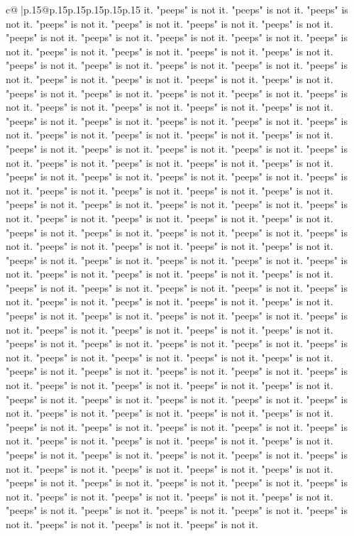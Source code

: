 \documentclass{article}
\begin{document}
{\begin{supertabular}{c@{$\;$}|p{.15\linewidth}@{}p{.15\linewidth}p{.15\linewidth}p{.15\linewidth}p{.15\linewidth}p{.15\linewidth}}
{{{it. "peeps" is not it. "peeps" is not it. "peeps" is not it. "peeps" is not it. "peeps" is not it. "peeps" is not it. "peeps" is not it. "peeps" is not it. "peeps" is not it. "peeps" is not it. "peeps" is not it. "peeps" is not it. "peeps" is not it. "peeps" is not it. "peeps" is not it. "peeps" is not it. "peeps" is not it. "peeps" is not it. "peeps" is not it. "peeps" is not it. "peeps" is not it. "peeps" is not it. "peeps" is not it. "peeps" is not it. "peeps" is not it. "peeps" is not it. "peeps" is not it. "peeps" is not it. "peeps" is not it. "peeps" is not it. "peeps" is not it. "peeps" is not it. "peeps" is not it. "peeps" is not it. "peeps" is not it. "peeps" is not it. "peeps" is not it. "peeps" is not it. "peeps" is not it. "peeps" is not it. "peeps" is not it. "peeps" is not it. "peeps" is not it. "peeps" is not it. "peeps" is not it. "peeps" is not it. "peeps" is not it. "peeps" is not it. "peeps" is not it. "peeps" is not it. "peeps" is not it. "peeps" is not it. "peeps" is not it. "peeps" is not it. "peeps" is not it. "peeps" is not it. "peeps" is not it. "peeps" is not it. "peeps" is not it. "peeps" is not it. "peeps" is not it. "peeps" is not it. "peeps" is not it. "peeps" is not it. "peeps" is not it. "peeps" is not it. "peeps" is not it. "peeps" is not it. "peeps" is not it. "peeps" is not it. "peeps" is not it. "peeps" is not it. "peeps" is not it. "peeps" is not it. "peeps" is not it. "peeps" is not it. "peeps" is not it. "peeps" is not it. "peeps" is not it. "peeps" is not it. "peeps" is not it. "peeps" is not it. "peeps" is not it. "peeps" is not it. "peeps" is not it. "peeps" is not it. "peeps" is not it. "peeps" is not it. "peeps" is not it. "peeps" is not it. "peeps" is not it. "peeps" is not it. "peeps" is not it. "peeps" is not it. "peeps" is not it. "peeps" is not it. "peeps" is not it. "peeps" is not it. "peeps" is not it. "peeps" is not it. "peeps" is not it. "peeps" is not it. "peeps" is not it. "peeps" is not it. "peeps" is not it. "peeps" is not it. "peeps" is not it. "peeps" is not it. "peeps" is not it. "peeps" is not it. "peeps" is not it. "peeps" is not it. "peeps" is not it. "peeps" is not it. "peeps" is not it. "peeps" is not it. "peeps" is not it. "peeps" is not it. "peeps" is not it. "peeps" is not it. "peeps" is not it. "peeps" is not it. "peeps" is not it. "peeps" is not it. "peeps" is not it. "peeps" is not it. "peeps" is not it. "peeps" is not it. "peeps" is not it. "peeps" is not it. "peeps" is not it. "peeps" is not it. "peeps" is not it. "peeps" is not it. "peeps" is not it. "peeps" is not it. "peeps" is not it. "peeps" is not it. "peeps" is not it. "peeps" is not it. "peeps" is not it. "peeps" is not it. "peeps" is not it. "peeps" is not it. "peeps" is not it. "peeps" is not it. "peeps" is not it. "peeps" is not it. "peeps" is not it. "peeps" is not it. "peeps" is not it. "peeps" is not it. "peeps" is not it. "peeps" is not it. "peeps" is not it. "peeps" is not it. "peeps" is not it. "peeps" is not it. "peeps" is not it. "peeps" is not it. "peeps" is not it. "peeps" is not it. "peeps" is not it. "peeps" is not it. "peeps" is not it. "peeps" is not it. "peeps" is not it. "peeps" is not it. }}}
\end{supertabular}}
\end{document}

